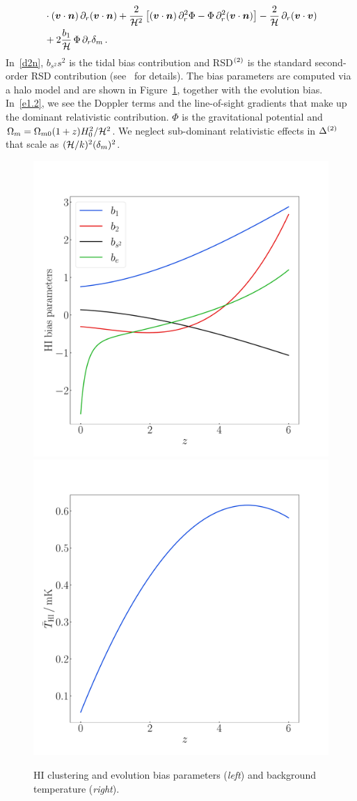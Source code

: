 \begin{itemize}
\begin{align}
&\cdot  (\bm{v}\cdot\bm {n})\,\partial_r(\bm{v} \cdot \bm {n}) + \frac{2}{\mathcal{H}^2}\left[(\bm{v}\cdot\bm {n}) \,\partial_r^2\Phi-\Phi\, \partial_r^2 (\bm{v}\cdot\bm {n}) \right]
 -\frac{2}{\mathcal{H}}\,\partial_r (\bm{v}\cdot\bm{v})\nonumber \\
 &+2 \frac{{b_{1}}}{\mathcal{H}}\,\Phi\, \partial_r\delta_m \label{e1.2}\,.
\end{align}
In~\eqref{d2n}, $b_{s^2}s^2$ is the tidal bias contribution and RSD$^{{(2)}}$ is the standard second-order RSD contribution (see~\cite{Maartens:2019yhx} for details). The bias parameters are computed via a halo model and are shown in Figure~\ref{fig:detectfigbiasparam}, together with the evolution bias.
In~\eqref{e1.2}, we see the Doppler terms and the line-of-sight gradients that make up the dominant relativistic contribution.
 $\Phi$ is the gravitational potential and $\Omega_m =\Omega_{m 0}(1+z)H_0^2/\mathcal{H}^2$. We  neglect sub-dominant relativistic effects in $\Delta^{{(2)}}$ that scale as  $(\mathcal{H}/k)^2(\delta_m)^2$. 
%
\begin{figure}[!ht]
\centering
\includegraphics[width=.49\textwidth]{fig/HIBias.pdf}
\includegraphics[width=.49\textwidth]{fig/THI.pdf}
\caption{HI clustering and evolution bias parameters (\emph{left}) and background temperature (\emph{right}).}\label{fig:detectfigbiasparam}
\end{figure}

\end{itemize}
